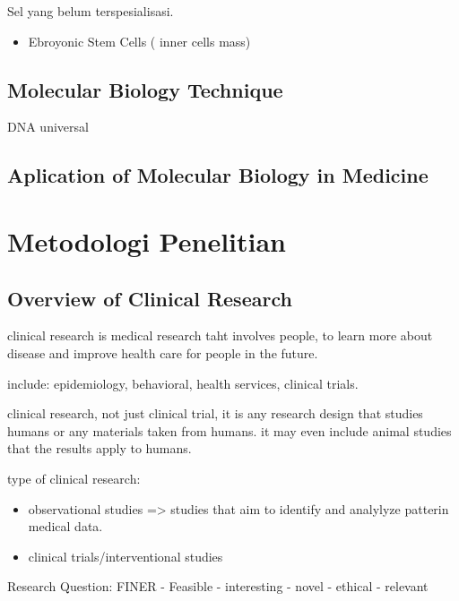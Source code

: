 \documentclass[
  letterpaper,
  DIV=11,
  numbers=noendperiod]{scrreprt}
\providecommand{\tightlist}{%
  \setlength{\itemsep}{0pt}\setlength{\parskip}{0pt}}\usepackage{longtable,booktabs,array}
\begin{document}
Sel yang belum terspesialisasi.

\begin{itemize}
\tightlist
\item
  Ebroyonic Stem Cells ( inner cells mass)
\end{itemize}

\section{Molecular Biology Technique}\label{molecular-biology-technique}

DNA universal

\section{Aplication of Molecular Biology in
Medicine}\label{aplication-of-molecular-biology-in-medicine}

\chapter{Metodologi Penelitian}\label{metodologi-penelitian}

\section{Overview of Clinical
Research}\label{overview-of-clinical-research}

clinical research is medical research taht involves people, to learn
more about disease and improve health care for people in the future.

include: epidemiology, behavioral, health services, clinical trials.

clinical research, not just clinical trial, it is any research design
that studies humans or any materials taken from humans. it may even
include animal studies that the results apply to humans.

type of clinical research:

\begin{itemize}
\tightlist
\item
  observational studies =\textgreater{} studies that aim to identify and
  analylyze patterin medical data.
\item
  clinical trials/interventional studies
\end{itemize}

Research Question: FINER - Feasible - interesting - novel - ethical -
relevant
\end{document}
